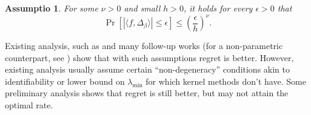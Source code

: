 \documentclass[11pt,a4paper]{article}
\theoremstyle{definition}
\theoremstyle{plain}
\newtheorem{assumption}{Assumptio}[section]
\theoremstyle{remark}
\begin{document}
\begin{assumption}
For some $\nu>0$ and small $h>0$, it holds for every $\epsilon>0$ that
$$
\Pr[|\langle f,\Delta_\beta\rangle|\leq\epsilon] \leq \left(\frac{\epsilon}{h}\right)^{\nu}.
$$
\end{assumption}

Existing analysis, such as \cite{goldenshluger2013linear} and many follow-up works (for a non-parametric counterpart, see \cite{hu2022smooth}) show that with such assumptions regret is better.
However, existing analysis usually assume certain ``non-degeneracy'' conditions akin to identifiability or lower bound on $\lambda_{\min}$ for which kernel methods don't have.
Some preliminary analysis shows that regret is still better, but may not attain the optimal rate. 



\end{document}
